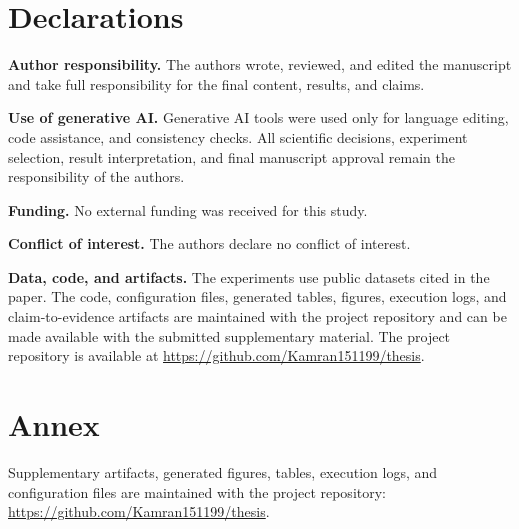 \chapter*{Declarations}
\textbf{Author responsibility.}
The authors wrote, reviewed, and edited the manuscript and take full responsibility for the final content, results, and claims.

\textbf{Use of generative AI.}
Generative AI tools were used only for language editing, code assistance, and consistency checks.
All scientific decisions, experiment selection, result interpretation, and final manuscript approval remain the responsibility of the authors.

\textbf{Funding.}
No external funding was received for this study.

\textbf{Conflict of interest.}
The authors declare no conflict of interest.

\textbf{Data, code, and artifacts.}
The experiments use public datasets cited in the paper.
The code, configuration files, generated tables, figures, execution logs, and claim-to-evidence artifacts are maintained with the project repository and can be made available with the submitted supplementary material.
The project repository is available at \url{https://github.com/Kamran151199/thesis}.

\chapter*{Annex}
    Supplementary artifacts, generated figures, tables, execution logs, and configuration files are maintained with the project repository: \url{https://github.com/Kamran151199/thesis}.
